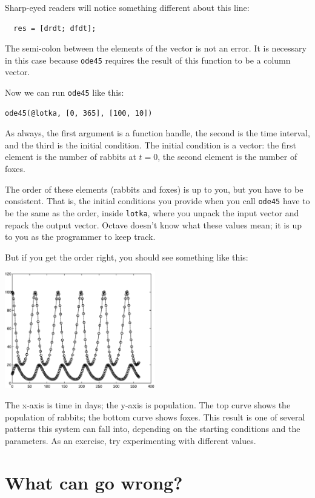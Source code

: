 \documentclass{book}
\begin{document}
Sharp-eyed readers will notice something different about this line:

\begin{verbatim}
  res = [drdt; dfdt];
\end{verbatim}

The semi-colon between the elements of the vector is not an error. It
is necessary in this case because {\tt ode45} requires the result of
this function to be a column vector.

Now we can run {\tt ode45} like this:

\begin{verbatim}
ode45(@lotka, [0, 365], [100, 10])
\end{verbatim}

As always, the first argument is a function handle, the second is the
time interval, and the third is the initial condition. The initial
condition is a vector: the first element is the number of rabbits at
$t=0$, the second element is the number of foxes.

The order of these elements (rabbits and foxes) is up to you, but
you have to be consistent. That is, the initial conditions you
provide when you call {\tt ode45} have to be the same as the order,
inside {\tt lotka}, where you unpack the input vector and repack
the output vector. Octave doesn't know what these values mean;
it is up to you as the programmer to keep track.

But if you get the order right, you should see something like this:

\beforefig \centerline{\includegraphics[height=2in]{figs/lotka.eps}}

The x-axis is time in days; the y-axis is population. The top
curve shows the population of rabbits; the bottom curve shows
foxes. This result is one of several patterns
this system can fall into, depending on the starting conditions
and the parameters. As an exercise, try experimenting with
different values.


\section{What can go wrong?}
\end{document}
